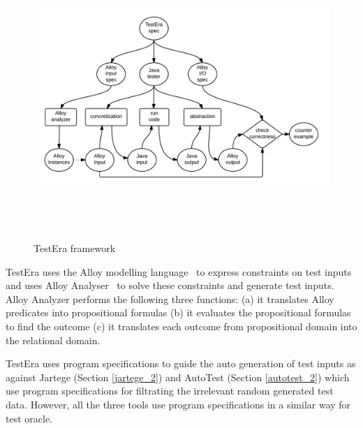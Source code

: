 \begin{figure}[h]
	\centering
	\centerline{\includegraphics[width=15cm, height=10.7cm]{chapter2/TestEra.png}}
	\caption{TestEra framework~\cite{marinov2001testera}}
	\label{fig:testera}
\end{figure}

TestEra uses the Alloy modelling language~\cite{jackson2001micromodularity} to express constraints on test inputs and uses Alloy Analyser~\cite{jackson2000alcoa} to solve these constraints and generate test inputs. Alloy Analyzer performs the following three functions: (a) it translates Alloy predicates into propositional formulas%
 (b) it evaluates the propositional formulas to find the outcome (c) it translates each outcome from propositional domain into the relational domain.




TestEra uses program specifications to guide the auto generation of test inputs as against Jartege (Section \ref{jartege_2}) and AutoTest (Section \ref{autotest_2}) which use program specifications for filtrating the irrelevant random generated test data. However, all the three tools use program specifications in a similar way for test oracle. 



